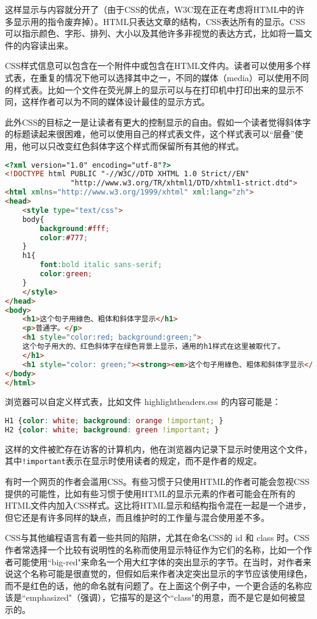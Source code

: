 这样显示与内容就分开了（由于CSS的优点，W3C现在正在考虑将HTML中的许多显示用的指令废弃掉）。HTML只表达文章的结构，CSS表达所有的显示。CSS可以指示颜色、字形、排列、大小以及其他许多非视觉的表达方式，比如将一篇文件的内容读出来。


CSS样式信息可以包含在一个附件中或包含在HTML文件内。读者可以使用多个样式表，在重复的情况下他可以选择其中之一，不同的媒体（media）可以使用不同的样式表。比如一个文件在荧光屏上的显示可以与在打印机中打印出来的显示不同，这样作者可以为不同的媒体设计最佳的显示方式。

此外CSS的目标之一是让读者有更大的控制显示的自由。假如一个读者觉得斜体字的标题读起来很困难，他可以使用自己的样式表文件，这个样式表可以“层叠”使用，他可以只改变红色斜体字这个样式而保留所有其他的样式。

\begin{lstlisting}[language=HTML]
<?xml version="1.0" encoding="utf-8"?>
<!DOCTYPE html PUBLIC "-//W3C//DTD XHTML 1.0 Strict//EN"
               "http://www.w3.org/TR/xhtml1/DTD/xhtml1-strict.dtd">
<html xmlns="http://www.w3.org/1999/xhtml" xml:lang="zh">
<head>
    <style type="text/css">
    body{
        background:#fff;
        color:#777;
    }
    h1{
        font:bold italic sans-serif;
        color:green;
    }
    </style>
</head>
<body>
    <h1>这个句子用綠色、粗体和斜体字显示</h1>
    <p>普通字。</p>
    <h1 style="color:red; background:green;">
    这个句子用大的、红色斜体字在绿色背景上显示，通用的h1样式在这里被取代了。
    </h1>
    <h1 style="color: green;"><strong><em>这个句子用綠色、粗体和斜体字显示</em></strong></h1>
</body>
</html>
\end{lstlisting}

浏览器可以自定义样式表，比如文件 highlightheaders.css 的内容可能是：

\begin{lstlisting}[language=CSS]
H1 {color: white; background: orange !important; }
H2 {color: white; background: green !important; }
\end{lstlisting}

这样的文件被贮存在访客的计算机内，他在浏览器内记录下显示时使用这个文件，其中\texttt{!important}表示在显示时使用读者的规定，而不是作者的规定。

有时一个网页的作者会滥用CSS。有些习惯于只使用HTML的作者可能会忽视CSS提供的可能性，比如有些习惯于使用HTML的显示元素的作者可能会在所有的HTML文件内加入CSS样式。这比将HTML显示和结构指令混在一起是一个进步，但它还是有许多同样的缺点，而且维护时的工作量与混合使用差不多。

CSS与其他编程语言有着一些共同的陷阱，尤其在命名CSS的 id 和 class 时。CSS作者常选择一个比较有说明性的名称而使用显示特征作为它们的名称，比如一个作者可能使用``big-red"来命名一个用大红字体的突出显示的字节。在当时，对作者来说这个名称可能是很直觉的，但假如后来作者决定突出显示的字节应该使用绿色，而不是红色的话，他的命名就有问题了。在上面这个例子中，一个更合适的名称应该是``emphasized"（强调），它描写的是这个``class"的用意，而不是它是如何被显示的。

